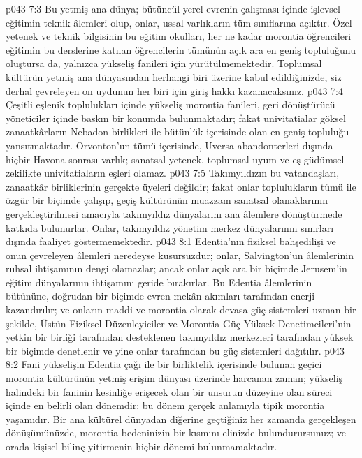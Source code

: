 \vs p043 7:3 Bu yetmiş ana dünya; bütüncül yerel evrenin çalışması içinde işlevsel eğitimin teknik âlemleri olup, onlar, ussal varlıkların tüm sınıflarına açıktır. Özel yetenek ve teknik bilgisinin bu eğitim okulları, her ne kadar morontia öğrencileri eğitimin bu derslerine katılan öğrencilerin tümünün açık ara en geniş topluluğunu oluştursa da, yalnızca yükseliş fanileri için yürütülmemektedir. Toplumsal kültürün yetmiş ana dünyasından herhangi biri üzerine kabul edildiğinizde, siz derhal çevreleyen on uydunun her biri için giriş hakkı kazanacaksınız.
\vs p043 7:4 Çeşitli eşlenik toplulukları içinde yükseliş morontia fanileri, geri dönüştürücü yöneticiler içinde baskın bir konumda bulunmaktadır; fakat univitatialar göksel zanaatkârların Nebadon birlikleri ile bütünlük içerisinde olan en geniş topluluğu yansıtmaktadır. Orvonton’un tümü içerisinde, Uversa abandonterleri dışında hiçbir Havona sonrası varlık; sanatsal yetenek, toplumsal uyum ve eş güdümsel zekilikte univitatiaların eşleri olamaz.
\vs p043 7:5 Takımyıldızın bu vatandaşları, zanaatkâr birliklerinin gerçekte üyeleri değildir; fakat onlar toplulukların tümü ile özgür bir biçimde çalışıp, geçiş kültürünün muazzam sanatsal olanaklarının gerçekleştirilmesi amacıyla takımyıldız dünyalarını ana âlemlere dönüştürmede katkıda bulunurlar. Onlar, takımyıldız yönetim merkez dünyalarının sınırları dışında faaliyet göstermemektedir.
\vs p043 8:1 Edentia’nın fiziksel bahşedilişi ve onun çevreleyen âlemleri neredeyse kusursuzdur; onlar, Salvington’un âlemlerinin ruhsal ihtişamının dengi olamazlar; ancak onlar açık ara bir biçimde Jerusem’in eğitim dünyalarının ihtişamını geride bırakırlar. Bu Edentia âlemlerinin bütününe, doğrudan bir biçimde evren mekân akımları tarafından enerji kazandırılır; ve onların maddi ve morontia olarak devasa güç sistemleri uzman bir şekilde, Üstün Fiziksel Düzenleyiciler ve Morontia Güç Yüksek Denetimcileri’nin yetkin bir birliği tarafından desteklenen takımyıldız merkezleri tarafından yüksek bir biçimde denetlenir ve yine onlar tarafından bu güç sistemleri dağıtılır.
\vs p043 8:2 Fani yükselişin Edentia çağı ile bir birliktelik içerisinde bulunan geçici morontia kültürünün yetmiş erişim dünyası üzerinde harcanan zaman; yükseliş halindeki bir faninin kesinliğe erişecek olan bir unsurun düzeyine olan süreci içinde en belirli olan dönemdir; bu dönem gerçek anlamıyla tipik morontia yaşamıdır. Bir ana kültürel dünyadan diğerine geçtiğiniz her zamanda gerçekleşen dönüşümünüzde, morontia bedeninizin bir kısmını elinizde bulundurursunuz; ve orada kişisel bilinç yitirmenin hiçbir dönemi bulunmamaktadır.

